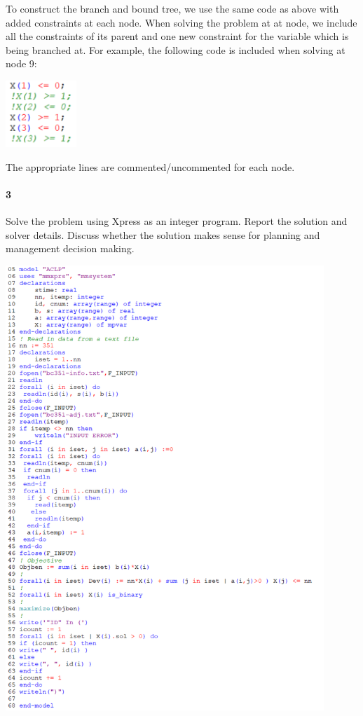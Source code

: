 \documentclass[12pt]{article}
\newenvironment{fullbox}{\begin{lrbox}{\savefullbox}\begin{minipage}{\dimexpr\textwidth-2\fboxsep\relax}}{\end{minipage}\end{lrbox}\begin{center}\framebox[\textwidth]{\usebox{\savefullbox}}\end{center}}
\newenvironment{pbox}[1][]{\begin{fullbox}\ifx#1\empty\else\paragraph{#1}\fi}{\end{fullbox}}
\theoremstyle{definition}
\begin{document}
To construct the branch and bound tree, we use the same code as above with added constraints at each node. When solving the problem at at node, we include all the constraints of its parent and one new constraint for the variable which is being branched at. For example, the following code is included when solving at node 9:
\begin{center}
    \includegraphics[width=0.2\textwidth]{code1b.png}
\end{center}
The appropriate lines are commented/uncommented for each node.





\newpage
\begin{pbox}[3]
    Solve the problem using Xpress as an integer program. Report the solution and solver details. Discuss whether the solution makes sense for planning and management decision making.
\end{pbox}

\begin{center}
    \includegraphics[width=0.9\textwidth]{code2.png}
\end{center}
\end{document}
